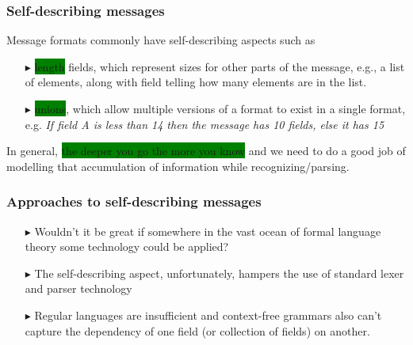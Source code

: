 \documentclass{beamer}
\newcommand{\gemph}[1]{\colorbox{green}{#1}}
\begin{document}
\begin{frame}[fragile]\frametitle{Self-describing messages}

Message formats commonly have self-describing aspects such as

\begin{itemize}

\item [$\blacktriangleright$] \gemph{length} fields, which represent
  sizes for other parts of the message, e.g., a list of elements,
  along with field telling how many elements are in the list.

\item [$\blacktriangleright$] \gemph{unions}, which allow multiple
  versions of a format to exist in a single format, e.g.  \textit{If
    field A is less than 14 then the message has 10 fields, else it
    has 15}

\end{itemize}

In general, \gemph{the deeper you go the more you know} and we need to
do a good job of modelling that accumulation of information while
recognizing/parsing.

\end{frame}

\begin{frame}\frametitle{Approaches to self-describing messages}

\begin{itemize}

\item [$\blacktriangleright$] Wouldn't it be great if somewhere in the
  vast ocean of formal language theory some technology could be
  applied?

\item [$\blacktriangleright$] The self-describing aspect,
  unfortunately, hampers the use of standard lexer and parser
  technology

\item [$\blacktriangleright$] Regular languages are insufficient and
  context-free grammars also can’t capture the dependency of one field
  (or collection of fields) on another.

\end{itemize}
\end{frame}
\end{document}
